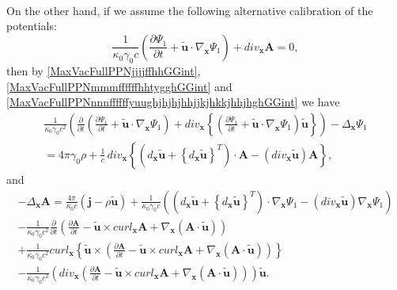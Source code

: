 \documentclass{article}
\theoremstyle{definition}
\theoremstyle{remark}
\renewcommand{\vec}[1]{\mathbf{#1}}
\newcommand{\er}{\eqref}
\newcommand{\er}{\eqref}
\begin{document}
\begin{multline}
\end{multline}
On the other hand, if we assume the following alternative
calibration of the potentials:
\begin{equation}\label{MaxVacFullPPNjjjjffhhGGint}
\frac{1}{\kappa_0\gamma_0 c}\left(\frac{\partial\Psi_1}{\partial
t}+\vec {\tilde u}\cdot\nabla_{\vec x}\Psi_1\right)+div_{\vec x}\vec
A=0,
\end{equation}
then by \er{MaxVacFullPPNjjjjffhhGGint},
\er{MaxVacFullPPNmmmffffffhhtygghGGint} and
\er{MaxVacFullPPNnnnffffffyuughjhjhjhhjjkjhkkjhhjhghGGint} we have
\begin{multline}\label{MaxVacFullPPNmmmffffffiuiuhjuGGint}
\frac{1}{\kappa_0\gamma_0 c^2}\left(\frac{\partial}{\partial
t}\left(\frac{\partial\Psi_1}{\partial t}+\vec {\tilde
u}\cdot\nabla_{\vec x}\Psi_1\right)+div_{\vec x}
\left\{\left(\frac{\partial\Psi_1}{\partial t}+\vec {\tilde
u}\cdot\nabla_{\vec x}\Psi_1\right)\vec {\tilde
u}\right\}\right)-\Delta_{\vec
x}\Psi_1\\=4\pi\gamma_0\rho+\frac{1}{c}\,div_{\vec x}
\left\{\left(d_{\vec x}\vec {\tilde u}+\left\{d_{\vec x}\vec {\tilde
u}\right\}^T\right)\cdot\vec A-\left(div_{\vec x}\vec {\tilde
u}\right)\vec A\right\},
\end{multline}
and
\begin{multline}\label{MaxVacFullPPNnnnffffffyuughjhjhjhhjjkjhkkjhujgGGint}
-\Delta_{\vec x}\vec A= \frac{4\pi}{\kappa_0 c}\left(\vec j-\rho\vec
{\tilde u}\right)+\frac{1}{\kappa_0\gamma_0 c}\left(\left(d_{\vec
x}\vec {\tilde u}+\left\{d_{\vec x}\vec {\tilde
u}\right\}^T\right)\cdot \nabla_{\vec x}\Psi_1-\left(div_{\vec
x}\vec {\tilde u}\right)\nabla_{\vec
x}\Psi_1\right)\\-\frac{1}{\kappa_0\gamma_0
c^2}\frac{\partial}{\partial t}\left(\frac{\partial\vec A}{\partial
t}-\vec {\tilde u}\times curl_{\vec x}\vec A+\nabla_{\vec
x}\left(\vec A\cdot\vec {\tilde
u}\right)\right)\\+\frac{1}{\kappa_0\gamma_0 c^2}curl_{\vec x}
\left\{\vec {\tilde u}\times
\left(\frac{\partial\vec A}{\partial t}-\vec {\tilde u}\times
curl_{\vec x}\vec A+\nabla_{\vec x}\left(\vec A\cdot\vec {\tilde
u}\right)\right)\right\}\\-\frac{1}{\kappa_0\gamma_0
c^2}\left(div_{\vec x}\left(\frac{\partial\vec A}{\partial t}-\vec
{\tilde u}\times curl_{\vec x}\vec A+\nabla_{\vec x}\left(\vec
A\cdot\vec {\tilde u}\right)\right)\right)\vec {\tilde u}.
\end{multline}
\end{document}
